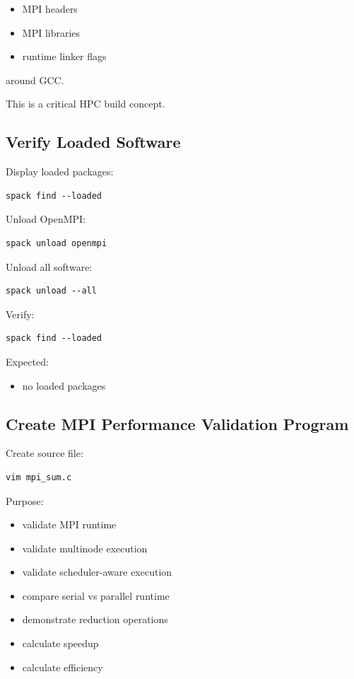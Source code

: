\documentclass[11pt]{article}
\begin{document}
\begin{itemize}
\item MPI headers
\item MPI libraries
\item runtime linker flags
\end{itemize}

around GCC.

This is a critical HPC build concept.
\subsection{Verify Loaded Software}
\label{sec:org67a40c8}

Display loaded packages:

\begin{verbatim}
spack find --loaded
\end{verbatim}

Unload OpenMPI:

\begin{verbatim}
spack unload openmpi
\end{verbatim}

Unload all software:

\begin{verbatim}
spack unload --all
\end{verbatim}

Verify:

\begin{verbatim}
spack find --loaded
\end{verbatim}

Expected:
\begin{itemize}
\item no loaded packages
\end{itemize}
\subsection{Create MPI Performance Validation Program}
\label{sec:orgbbc937b}

Create source file:

\begin{verbatim}
vim mpi_sum.c
\end{verbatim}

Purpose:

\begin{itemize}
\item validate MPI runtime
\item validate multinode execution
\item validate scheduler-aware execution
\item compare serial vs parallel runtime
\item demonstrate reduction operations
\item calculate speedup
\item calculate efficiency
\end{itemize}
\end{document}
